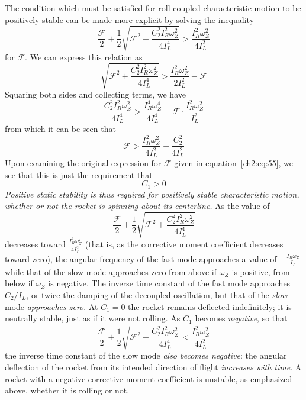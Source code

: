The condition which must be satisfied for roll-coupled characteristic motion
to be positively stable can be made more explicit by solving the inequality
\begin{equation*}
\frac{\mathscr{F}}{2} + \frac{1}{2}\sqrt{\mathscr{F}^2
  + \frac{C_2^2 I_R^2\omega_Z^2}{4I_L^4}} > \frac{I_R^2\omega_Z^2}{4I_L^2}
\end{equation*}
for $\mathscr{F}$. We can express this relation as
\begin{equation*}
\sqrt{\mathscr{F}^2 + \frac{C_2^2 I_R^2\omega_Z^2}{4I_L^4}}
  > \frac{I_R^2\omega_Z^2}{2I_L^2} - \mathscr{F}
\end{equation*}
Squaring both sides and collecting terms, we have
\begin{equation*}
\frac{C_2^2 I_R^2\omega_Z^2}{4I_L^4}
  > \frac{I_R^4\omega_Z^4}{4I_L^4} - \mathscr{F}\cdot\frac{I_R^2\omega_Z^2}{I_L^2}
\end{equation*}
from which it can be seen that
\begin{equation*}
\mathscr{F} > \frac{I_R^2\omega_Z^2}{4I_L^2} - \frac{C_2^2}{4I_L^2}
\end{equation*}
Upon examining the original expression for $\mathscr{F}$ given in
equation~\eqref{ch2:eq:55}, we see that this is just the requirement that
\begin{equation*}
C_1 > 0
\end{equation*}
\emph{Positive static stability is thus required for positively stable
characteristic motion, whether or not the rocket is spinning about its
centerline.} As the value of
\begin{equation*}
\frac{\mathscr{F}}{2} + \frac{1}{2}\sqrt{\mathscr{F}^2
  + \frac{C_2^2 I_R^2\omega_Z^2}{4I_L^4}}
\end{equation*}
decreases toward $\frac{I_R^2\omega_Z^2}{4I_L^2}$ (that is, as the corrective
moment coefficient decreases toward zero), the angular frequency of the fast
mode approaches a value of $-\frac{I_R\omega_Z}{I_L}$ while that of the slow
mode approaches zero from above if $\omega_Z$ is positive, from below if
$\omega_Z$ is negative. The inverse time constant of the fast mode approaches
$C_2/I_L$, or twice the damping of the decoupled oscillation, but that of the
\emph{slow} mode \emph{approaches zero}. At $C_1 = 0$ the rocket remains
deflected indefinitely; it is neutrally stable, just as if it were not
rolling. As $C_1$ becomes \emph{negative}, so that
\begin{equation*}
\frac{\mathscr{F}}{2} + \frac{1}{2}\sqrt{\mathscr{F}^2
  + \frac{C_2^2 I_R^2\omega_Z^2}{4I_L^4}} < \frac{I_R^2\omega_Z^2}{4I_L^2}
\end{equation*}
the inverse time constant of the slow mode \emph{also becomes negative}: the
angular deflection of the rocket from its intended direction of flight
\emph{increases with time}. A rocket with a negative corrective moment
coefficient is unstable, as emphasized above, whether it is rolling or not.

